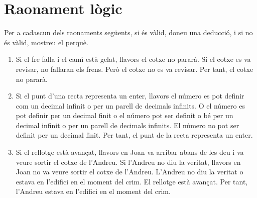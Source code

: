 \section{Raonament l\`{o}gic}

\begin{exercici}
Per a cadascun dels raonaments seg\"{u}ents, si \'{e}s v\`{a}lid, doneu una
deducci\'{o}, i si no \'{e}s v\`{a}lid, mostreu el perqu\`{e}.

\begin{enumerate}
\item Si el fre falla i el cam\'{\i} est\`{a} gelat, llavors el cotxe no
parar\`{a}. Si el cotxe es va revisar, no fallaran els frens. Per\`{o} el
cotxe no es va revisar. Per tant, el cotxe no parar\`{a}.

\item Si el punt d'una recta representa un enter, llavors el n\'{u}mero es pot
definir com un decimal infinit o per un parell de decimals infinits. O el
n\'{u}mero es pot definir per un decimal finit o el n\'{u}mero pot ser definit
o b\'{e} per un decimal infinit o per un parell de decimals infinits. El
n\'{u}mero no pot ser definit per un decimal finit. Per tant, el punt de la
recta representa un enter.

\item Si el rellotge est\`{a} avan\c{c}at, llavors en Joan va arribar abans de
les deu i va veure sortir el cotxe de l'Andreu. Si l'Andreu no diu la veritat,
llavors en Joan no va veure sortir el cotxe de l'Andreu. L'Andreu no diu la
veritat o estava en l'edifici en el moment del crim. El rellotge est\`{a}
avan\c{c}at. Per tant, l'Andreu estava en l'edifici en el moment del crim.
\end{enumerate}
\end{exercici}

